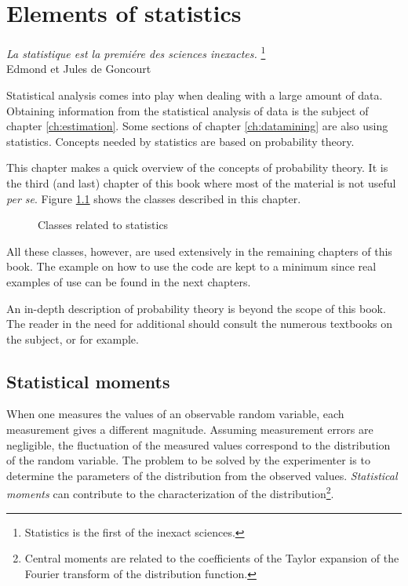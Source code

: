 \documentclass[twoside]{book}
\begin{document}
\fi

\chapter{Elements of statistics}
\label{ch:statistics} \vspace{1 ex}
\begin{flushright} {\sl La statistique est la premi\'ere des sciences inexactes.}
\footnote{Statistics is the first of the inexact sciences.}\\
Edmond et Jules de Goncourt
\end{flushright}
\vspace{1 ex} Statistical analysis comes into play when dealing
with a large amount of data. Obtaining information from the
statistical analysis of data is the subject of chapter
\ref{ch:estimation}. Some sections of chapter \ref{ch:datamining}
are also using statistics. Concepts needed by statistics are based
on probability theory.

This chapter makes a quick overview of the concepts of probability
theory. It is the third (and last) chapter of this book where most
of the material is not useful {\it per se}. Figure
\ref{fig:statisticsclasses} shows the classes described in this
chapter.
\begin{figure}
\center{}
\caption{Classes related to statistics}
\label{fig:statisticsclasses}
\end{figure}
All these classes, however, are used extensively in the remaining
chapters of this book. The example on how to use the code are kept
to a minimum since real examples of use can be found in the next
chapters.

An in-depth description of probability theory is beyond the scope
of this book. The reader in the need for additional should consult
the numerous textbooks on the subject, \cite{PhiTay} or
\cite{LawKel} for example.

\section{Statistical moments}
\label{sec:moments} When one measures the values of an observable
random variable, each measurement gives a different magnitude.
Assuming measurement errors are negligible, the fluctuation of the
measured values correspond to the distribution of the random
variable. The problem to be solved by the experimenter is to
determine the parameters of the distribution from the observed
values. {\sl Statistical moments} can contribute to the
characterization of the distribution\footnote{Central moments are
related to the coefficients of the Taylor expansion of the Fourier
transform of the distribution function.}.
\end{document}
